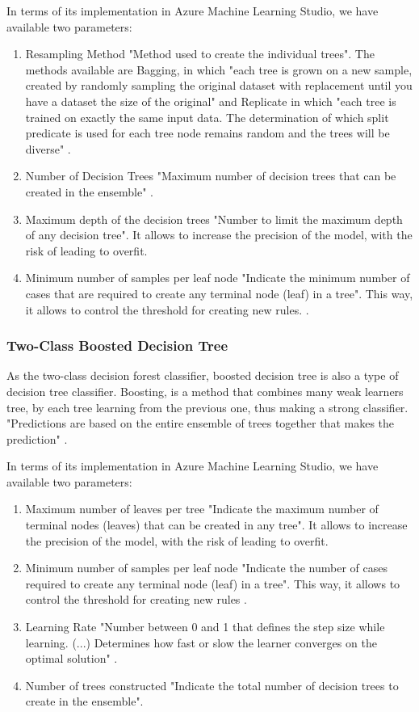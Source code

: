 In terms of its implementation in Azure Machine Learning Studio, we have available two parameters:
\begin{enumerate}
    \item{Resampling Method}
"Method used to create the individual trees". The methods available are Bagging, in which "each tree is grown on a new sample, created by randomly sampling the original dataset with replacement until you have a dataset the size of the original" and Replicate in which "each tree is trained on exactly the same input data. The determination of which split predicate is used for each tree node remains random and the trees will be diverse" \cite{AZURE_MACHINE_LEARNING}.
    \item{Number of Decision Trees}
"Maximum number of decision trees that can be created in the ensemble" \cite{AZURE_MACHINE_LEARNING}.
    \item{Maximum depth of the decision trees}
"Number to limit the maximum depth of any decision tree". It allows to increase the precision of the model, with the risk of leading to overfit. \cite{AZURE_MACHINE_LEARNING}
    \item{Minimum number of samples per leaf node}
"Indicate the minimum number of cases that are required to create any terminal node (leaf) in a tree". This way, it allows to control the threshold for creating new rules. \cite{AZURE_MACHINE_LEARNING}.
\end{enumerate}

\subsubsection{Two-Class Boosted Decision Tree}
As the two-class decision forest classifier, boosted decision tree is also a type of decision tree classifier. Boosting, is a method that combines many weak learners tree, by each tree learning from the previous one, thus making a strong classifier. "Predictions are based on the entire ensemble of trees together that makes the prediction" \cite{AZURE_MACHINE_LEARNING}.

In terms of its implementation in Azure Machine Learning Studio, we have available two parameters:
\begin{enumerate}
    \item{Maximum number of leaves per tree}
"Indicate the maximum number of terminal nodes (leaves) that can be created in any tree". It allows to increase the precision of the model, with the risk of leading to overfit. \cite{AZURE_MACHINE_LEARNING}
    \item{Minimum number of samples per leaf node}
"Indicate the number of cases required to create any terminal node (leaf) in a tree". This way, it allows to control the threshold for creating new rules \cite{AZURE_MACHINE_LEARNING}.
    \item{Learning Rate}
"Number between 0 and 1 that defines the step size while learning. (...) Determines how fast or slow the learner converges on the optimal solution" \cite{AZURE_MACHINE_LEARNING}.
    \item{Number of trees constructed}
"Indicate the total number of decision trees to create in the ensemble". \cite{AZURE_MACHINE_LEARNING}
\end{enumerate}

